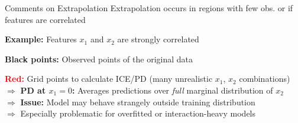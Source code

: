 \documentclass[10pt,compress,t,notes=noshow, xcolor=table]{beamer}
\begin{document}


\begin{framev}[align=top]{Comments on Extrapolation}
Extrapolation occurs in regions with few obs. or if features are correlated
\begin{itemizeM}
\item \textbf{Example:} Features $x_1$ and $x_2$ are strongly correlated
\item \textbf{Black points:} Observed points of the original data
\item \textbf{\textcolor{red}{Red:}} Grid points to calculate ICE/PD (many unrealistic $x_1$, $x_2$ combinations)\\ %
$\Rightarrow$ %
\textbf{PD at $x_1=0$:} Averages predictions over \textit{full} marginal distribution of $x_2$\\
$\Rightarrow$ \textbf{Issue:} Model may behave strangely outside training distribution\\
$\Rightarrow$ Especially problematic for overfitted or interaction-heavy models
\end{itemizeM}
%
%
%
%
\end{framev}
\end{document}
